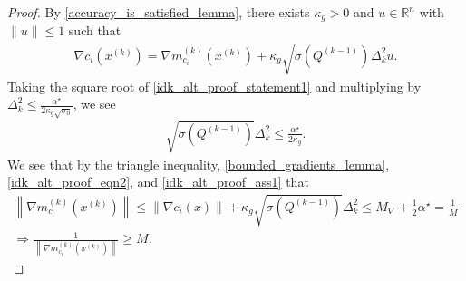 \documentclass{article}
\theoremstyle{case}
\numberwithin{theorem}{subsection}
\newcommand{\dk}{\Delta_k}
\newcommand{\gmcik}{{\nabla m_{c_i}^{(k)}\left(\xk\right)}}
\newcommand{\maxgrad}{{M_{\nabla}}}
\newcommand{\minanglealpha}{{ \alpha^{\star} }}
\newcommand{\Rn}{\mathbb R^n}
\newcommand{\xk}{{x^{(k)}}}
\begin{document}
\begin{proof}
By \cref{accuracy_is_satisfied_lemma}, there exists $\kappa_{g} > 0$ and $u\in\Rn$ with $\|u\|\le 1$ such that
\begin{align}
\nabla c_i\left(\xk\right) = \gmcik + \kappa_g \sqrt{\sigma\left( Q^{(k-1)} \right)}\dk^2 u. \label{idk_alt_proof_eqn2}
\end{align}
Taking the square root of \cref{idk_alt_proof_statement1} and multiplying by $\dk^2 \le \frac {\minanglealpha}{2\kappa_g\sqrt{\sigma_0}}$, we see
\begin{align}
\sqrt{\sigma\left( Q^{(k-1)} \right)} \dk^2 \le \frac {\minanglealpha} {2\kappa_g}. \label{idk_alt_proof_ass1}
\end{align}
We see that by the triangle inequality, \cref{bounded_gradients_lemma}, \cref{idk_alt_proof_eqn2}, and \cref{idk_alt_proof_ass1} that
\begin{align}
\left\|\gmcik\right\| \le \left\| \nabla c_i\left(x\right)\right\| + \kappa_g \sqrt{\sigma\left( Q^{(k-1)} \right)} \dk^2 \le \maxgrad + \frac 1 2 \minanglealpha = \frac 1 M \nonumber \\
\Longrightarrow \frac 1 {\left\|\gmcik\right\|} \ge M. \label{idk_alt_proof_eqn4}
\end{align}


\end{proof}
\end{document}
